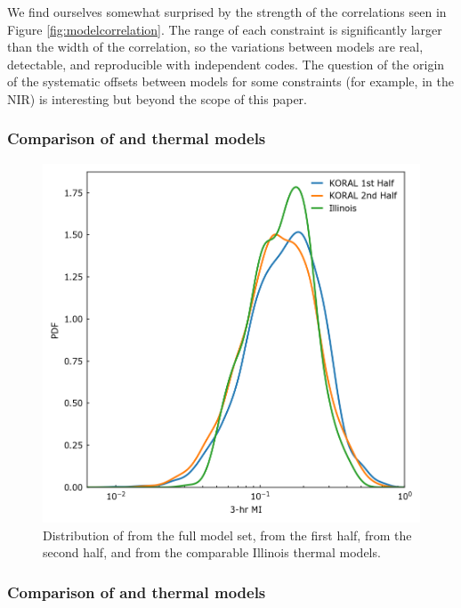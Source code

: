 We find ourselves somewhat surprised by the strength of the correlations seen in Figure \ref{fig:modelcorrelation}.  The range of each constraint is significantly larger than the width of the correlation, so the variations between models are real, detectable, and reproducible with independent codes.  The question of the origin of the systematic offsets between models for some constraints (for example, in the NIR) is interesting but beyond the scope of this paper.   

\subsubsection{Comparison of \kharma and \koral thermal models}

\begin{figure}
  \centering
  \includegraphics[width=\columnwidth]{./figures/Koral_vs_IL_MI.png}
  \caption{Distribution of  from the full \koral model set, from the first half, from the second half, and from the comparable Illinois thermal models.}
  \label{fig:koral_MI}
\end{figure}  

\subsubsection{Comparison of \kharma and \hamr thermal models}

